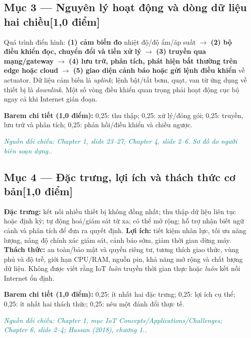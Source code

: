 \documentclass[11pt,a4paper]{article}
\newcommand{\pointpart}[2]{\subsection*{Mục #1 --- #2\hfill\normalsize\color{teal}[1,0 điểm]}}
\newcommand{\src}[1]{\par\noindent\textcolor{teal}{\footnotesize\textit{Nguồn đối chiếu: #1.}}\par}
\newcommand{\scoring}[1]{\par\noindent\textbf{Barem chi tiết (1,0 điểm):} #1\par}
\newcommand{\kw}[1]{\textbf{#1}}
\begin{document}
\pointpart{3}{Nguyên lý hoạt động và dòng dữ liệu hai chiều}
Quá trình điển hình: \kw{(1) cảm biến đo} nhiệt độ/độ ẩm/áp suất $\rightarrow$ \kw{(2) bộ điều khiển đọc, chuyển đổi và tiền xử lý} $\rightarrow$ \kw{(3) truyền qua mạng/gateway} $\rightarrow$ \kw{(4) lưu trữ, phân tích, phát hiện bất thường trên edge hoặc cloud} $\rightarrow$ \kw{(5) giao diện cảnh báo hoặc gửi lệnh điều khiển} về actuator. Dữ liệu cảm biến là \emph{uplink}; lệnh bật/tắt bơm, quạt, van từ ứng dụng về thiết bị là \emph{downlink}. Một số vòng điều khiển quan trọng phải hoạt động cục bộ ngay cả khi Internet gián đoạn.

\begin{center}\end{center}
\scoring{0,25: thu thập; 0,25: xử lý/đóng gói; 0,25: truyền, lưu trữ và phân tích; 0,25: phản hồi/điều khiển và chiều ngược.}
\src{Chapter 1, slide 23--27; Chapter 4, slide 2--6. Sơ đồ do người biên soạn dựng.}

\pointpart{4}{Đặc trưng, lợi ích và thách thức cơ bản}
\kw{Đặc trưng:} kết nối nhiều thiết bị không đồng nhất; thu thập dữ liệu liên tục hoặc định kỳ; tự động hoá/giám sát từ xa; có thể mở rộng; hỗ trợ nhận biết ngữ cảnh và phân tích để đưa ra quyết định. \kw{Lợi ích:} tiết kiệm nhân lực, tối ưu năng lượng, nâng độ chính xác giám sát, cảnh báo sớm, giảm thời gian dừng máy. \kw{Thách thức:} an toàn/bảo mật và quyền riêng tư, tương thích giao thức, vùng phủ và độ trễ, giới hạn CPU/RAM, nguồn pin, khả năng mở rộng và chất lượng dữ liệu. Không được viết rằng IoT \emph{luôn} truyền thời gian thực hoặc \emph{luôn} kết nối Internet ổn định.
\scoring{0,25: ít nhất hai đặc trưng; 0,25: lợi ích cụ thể; 0,25: ít nhất hai thách thức; 0,25: nêu một đánh đổi thực tế.}
\src{Chapter 1, mục IoT Concepts/Applications/Challenges; Chapter 6, slide 2--4; Hassan (2018), chương 1.}
\end{document}
